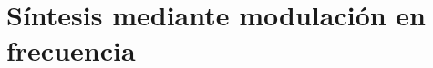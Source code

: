 \documentclass[assd_tp2_main.tex]{subfiles}
\begin{document}
\section{Síntesis mediante modulación en frecuencia}
\end{document}

